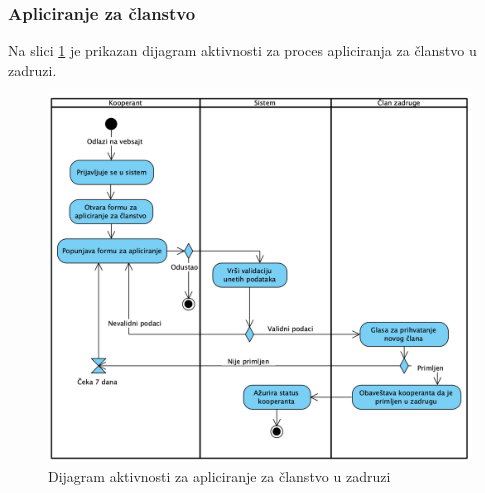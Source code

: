 \documentclass[a4paper, oneside]{article}
\begin{document}
\subsubsection{Apliciranje za članstvo}
Na slici \ref{dakt_apliciranje_clanstvo} je prikazan dijagram aktivnosti za proces apliciranja za članstvo u zadruzi.
\begin{figure}[h!]
    \centering
    \includegraphics[scale=0.55]{images/dakt_apliciranje_clanstvo.png}
    \caption{Dijagram aktivnosti za apliciranje za članstvo u zadruzi}
    \label{dakt_apliciranje_clanstvo}
\end{figure}
\clearpage
\end{document}
